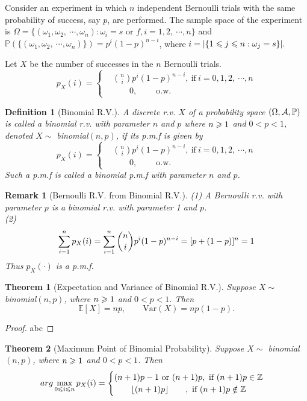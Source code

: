 \documentclass[openany,12pt]{book}
\newtheorem{theorem}{Theorem}[chapter]
\newtheorem{remark}{Remark}[chapter]
\newtheorem{definition}{Definition}[chapter]
\begin{document}
Consider an experiment in which $n$ independent Bernoulli trials with the same probability of success, say $p$, are performed. The sample space of the experiment is $\Omega=\{(\omega_1,\omega_2,\ \cdots,\omega_n ): \omega_i=s \text{ or } f,i=1,2,\ \cdots,n\} $ and $\mathbb{P}(\{(\omega_1,\omega_2,\ \cdots,\omega_n )\})=p^i (1-p)^{n-i}$, where $i=|\{1\leqslant j\leqslant n: \omega_j=s\}|.$

Let $X$ be the number of successes in the $n$ Bernoulli trials.
$$
p_X (i)=
\left\{\begin{aligned}
&\binom n i p^i(1-p)^{n-i},\ \text{if}\ i=0,1,2,\ \cdots,n\\
&\qquad0,\qquad\ \text{o.w.}    
\end{aligned}
\right.
$$

\begin{definition}[Binomial R.V.]
A discrete r.v. $X$ of a probability space $(\Omega,\mathcal{A},\mathbb{P})$ is called a binomial r.v. with parameter $n$ and $p$ where $n\geqslant 1$ and $0<p<1$, denoted $X\sim$ binomial$(n,p)$, if its p.m.f is given by
$$
p_X (i)=
\left\{\begin{aligned}
&\binom n i p^i(1-p)^{n-i},\ \text{if}\ i=0,1,2,\ \cdots,n\\
&\qquad0,\qquad\ \text{o.w.}    
\end{aligned}
\right.
$$
Such a p.m.f is called a binomial p.m.f with parameter $n$ and $p$.
\end{definition}

\begin{remark}[Bernoulli R.V. from Binomial R.V.]
(1) A Bernoulli r.v. with parameter $p$ is a binomial r.v. with parameter 1 and $p$.\\
(2)
$$
\sum_{i=1}^{n} p_X(i)=\sum_{i=1}^{n}\binom n i p^i(1-p)^{n-i}=[p+(1-p)]^n=1
$$
Thus $p_X (\cdot)$ is a p.m.f.
\end{remark}

\begin{theorem}[Expectation and Variance of Binomial R.V.]
Suppose $X\sim$ binomial$(n,p)$, where $n\geqslant1$ and $0<p<1$. Then 
$$\mathbb{E}[X]=np,\qquad \mathrm{Var}(X)=np(1-p).$$
\vspace{0.01cm}
\end{theorem}

\begin{proof}
  abc
\end{proof}

\begin{theorem}[Maximum Point of Binomial Probability]
Suppose $X\sim$ binomial$(n,p)$, where $n\geqslant1$ and $0<p<1$. Then
$$
arg\max_{0\leqslant i\leqslant n} p_X (i)=
\begin{cases}
(n+1)p-1 \text{  or  } (n+1)p,\ \text{if }  (n+1)p\in\mathbb{Z}\\
\qquad\lfloor(n+1)p\rfloor\qquad, \ \text{if }  (n+1)p\notin\mathbb{Z}
\end{cases}
$$
\end{theorem}
\end{document}
